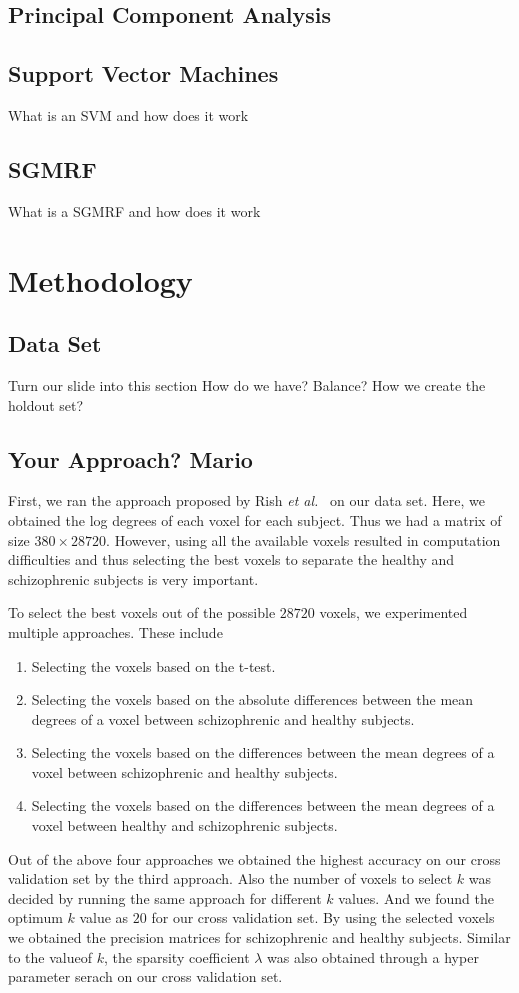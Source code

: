 \documentclass{article} %
\begin{document}
\subsection{Principal Component Analysis}

\subsection{Support Vector Machines}
What is an SVM and how does it work

\subsection{SGMRF}
What is a SGMRF and how does it work


\section{Methodology}

\subsection{Data Set}
Turn our slide into this section
How do we have? Balance? 
How we create the holdout set?


\subsection{Your Approach? Mario}
First, we ran the approach proposed by Rish \emph{et al.}~\cite{Rish_2013} on our data set. Here, we obtained the log degrees of each voxel for each subject. Thus we had a matrix of size  $380 \times 28720$. However, using all the available voxels resulted in computation difficulties and thus selecting the best voxels to separate the healthy and schizophrenic subjects is very important. 

To select the best voxels out of the possible $28720$ voxels, we experimented multiple approaches. These include \begin{enumerate}
  \item Selecting the voxels based on the t-test.
  \item Selecting the voxels based on the absolute differences between the mean degrees of a voxel between schizophrenic and healthy subjects.
  \item Selecting the voxels based on the differences between the mean degrees of a voxel between schizophrenic and healthy subjects.
  \item Selecting the voxels based on the differences between the mean degrees of a voxel between healthy and schizophrenic subjects.
\end{enumerate}
Out of the above four approaches we obtained the highest accuracy on our cross validation set by the third approach. Also the number of voxels to select $k$ was decided by running the same approach for different $k$ values. And we found the optimum $k$ value as $20$ for our cross validation set. By using the selected voxels we obtained the precision matrices for schizophrenic and healthy subjects. Similar to the valueof $k$, the sparsity coefficient $\lambda$ was also obtained through a hyper parameter serach on our cross validation set.
\end{document}
